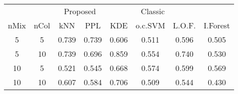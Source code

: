 
\begin{tabular}{cccccccc}
\toprule
\multicolumn{2}{c}{ } & \multicolumn{2}{c}{Proposed} & \multicolumn{3}{c}{Classic} \\
\cmidrule(l{3pt}r{3pt}){3-4} \cmidrule(l{3pt}r{3pt}){5-7}
nMix & nCol & kNN & PPL & KDE & o.c.SVM & L.O.F. & I.Forest\\
\midrule
5 & 5 & 0.739 & 0.739 & 0.606 & 0.511 & 0.596 & 0.505\\
5 & 10 & 0.739 & 0.696 & 0.859 & 0.554 & 0.740 & 0.530\\
10 & 5 & 0.521 & 0.545 & 0.668 & 0.574 & 0.599 & 0.569\\
10 & 10 & 0.607 & 0.584 & 0.706 & 0.509 & 0.544 & 0.430\\
\bottomrule
\end{tabular}
